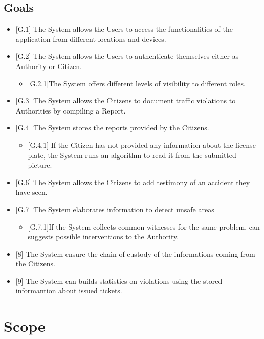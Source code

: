 \documentclass{report}
\begin{document}
\subsection{Goals}
\begin{itemize}
    \item {[G.1]} The System allows the Users to access the functionalities of the application from different locations and devices.
    \item {[G.2]} The System allows the Users to authenticate themselves either as Authority or Citizen.
    \begin{itemize}
    		\item {[G.2.1]}The System offers different levels of visibility to different roles.
    \end{itemize}
    \item {[G.3]} The System allows the Citizens to document traffic violations to Authorities by compiling a Report.
    \item {[G.4]} The System stores the reports provided by the Citizens.
    \begin{itemize}
    		\item {[G.4.1]} If the Citizen has not provided any information about the license plate, the System runs an algorithm 			to read it from the submitted picture.
    	\end{itemize}     

    \item {[G.6]} The System allows the Citizens to add testimony of an accident they have seen.
    \item {[G.7]} The System elaborates information to detect unsafe areas
    \begin{itemize}
    		\item {[G.7.1]}If the System collects common witnesses for the same problem, can suggests possible interventions to the 		Authority.
    \end{itemize}    
    \item {[8]} The System ensure the chain of custody of the informations coming from the Citizens.
    \item{[9]} The System can builds statistics on violations using the stored informantion about issued tickets.
\end{itemize}

\section{Scope}
\end{document}
